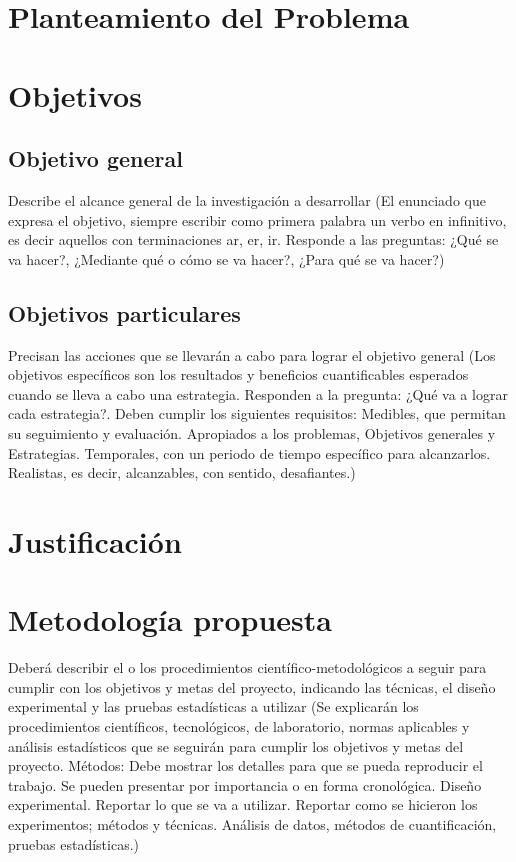\documentclass[letterpaper,12pt,oneside]{article}
\begin{document}
\section{Planteamiento del Problema}

\section{Objetivos}

\subsection{Objetivo general}
Describe el alcance general de la investigación a desarrollar (El enunciado que expresa el objetivo, siempre escribir como primera palabra un verbo en infinitivo, es decir aquellos con terminaciones ar, er, ir. Responde a las preguntas: ¿Qué se va hacer?, ¿Mediante qué o cómo se va hacer?, ¿Para qué se va hacer?)

\subsection{Objetivos particulares}
Precisan las acciones que se llevarán a cabo para lograr el objetivo general (Los objetivos específicos son los resultados y beneficios cuantificables esperados cuando se lleva a cabo una estrategia. Responden a la pregunta: ¿Qué va a lograr cada estrategia?. Deben cumplir los siguientes requisitos: Medibles, que permitan su seguimiento y evaluación. Apropiados a los problemas, Objetivos generales y Estrategias. Temporales, con un periodo de tiempo específico para alcanzarlos. Realistas, es decir, alcanzables, con sentido, desafiantes.)

\section{Justificación}

\section{Metodología propuesta}
Deberá describir el o los procedimientos científico-metodológicos a seguir para cumplir con los objetivos y metas del proyecto, indicando las técnicas, el diseño experimental y las pruebas estadísticas a utilizar (Se explicarán los procedimientos científicos, tecnológicos, de laboratorio, normas aplicables y análisis estadísticos que se seguirán para cumplir los objetivos y metas del proyecto. Métodos: Debe mostrar los detalles para que se pueda reproducir el trabajo. Se pueden presentar por importancia o en forma cronológica. Diseño experimental. Reportar lo que se va a utilizar. Reportar como se hicieron los experimentos; métodos y técnicas. Análisis  de datos, métodos de cuantificación, pruebas estadísticas.)
\end{document}
